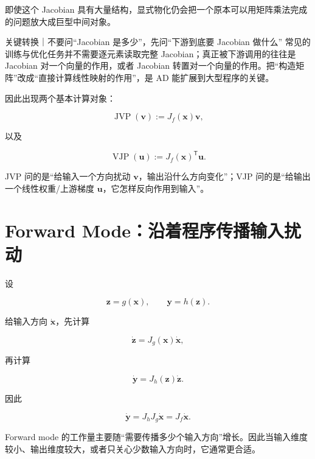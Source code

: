 \documentclass[profile=standard,twoside=false]{ipara-handbook}
\begin{document}
即使这个 Jacobian 具有大量结构，显式物化仍会把一个原本可以用矩阵乘法完成的问题放大成巨型中间对象。

\begin{mechanism}{关键转换｜不要问“Jacobian 是多少”，先问“下游到底要 Jacobian 做什么”}
常见的训练与优化任务并不需要逐元素读取完整 Jacobian；真正被下游调用的往往是 Jacobian 对一个向量的作用，或者 Jacobian 转置对一个向量的作用。把“构造矩阵”改成“直接计算线性映射的作用”，是 AD 能扩展到大型程序的关键。
\end{mechanism}

因此出现两个基本计算对象：

$$
\operatorname{JVP}(\boldsymbol{v})
:=J_f(\boldsymbol{x})\boldsymbol{v},
$$

以及

$$
\operatorname{VJP}(\boldsymbol{u})
:=J_f(\boldsymbol{x})^{\mathsf T}\boldsymbol{u}.
$$

JVP 问的是“给输入一个方向扰动 $\boldsymbol{v}$，输出沿什么方向变化”；VJP 问的是“给输出一个线性权重/上游梯度 $\boldsymbol{u}$，它怎样反向作用到输入”。

\section{Forward Mode：沿着程序传播输入扰动}

设

$$
\boldsymbol{z}=g(\boldsymbol{x}),\qquad
\boldsymbol{y}=h(\boldsymbol{z}).
$$

给输入方向 $\dot{\boldsymbol{x}}$，先计算

$$
\dot{\boldsymbol{z}}
=J_g(\boldsymbol{x})\dot{\boldsymbol{x}},
$$

再计算

$$
\dot{\boldsymbol{y}}
=J_h(\boldsymbol{z})\dot{\boldsymbol{z}}.
$$

因此

$$
\dot{\boldsymbol{y}}
=J_hJ_g\dot{\boldsymbol{x}}
=J_f\dot{\boldsymbol{x}}.
$$

\begin{processchain}
\end{processchain}

Forward mode 的工作量主要随“需要传播多少个输入方向”增长。因此当输入维度较小、输出维度较大，或者只关心少数输入方向时，它通常更合适。
\end{document}
